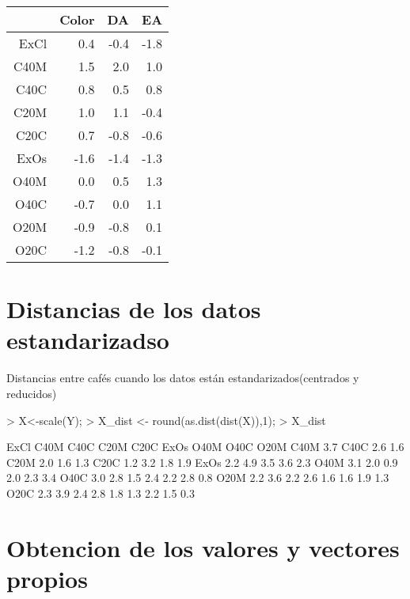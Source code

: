 \documentclass{article}
\begin{document}
\begin{table}[ht]
\centering
\begin{tabular}{rrrr}
\hline
& Color & DA & EA \\
\hline
ExCl & 0.4 & -0.4 & -1.8 \\
C40M & 1.5 & 2.0 & 1.0 \\
C40C & 0.8 & 0.5 & 0.8 \\
C20M & 1.0 & 1.1 & -0.4 \\
C20C & 0.7 & -0.8 & -0.6 \\
ExOs & -1.6 & -1.4 & -1.3 \\
O40M & 0.0 & 0.5 & 1.3 \\
O40C & -0.7 & 0.0 & 1.1 \\
O20M & -0.9 & -0.8 & 0.1 \\
O20C & -1.2 & -0.8 & -0.1 \\
\hline
\end{tabular}
\end{table}

\section{Distancias de los datos estandarizadso}
Distancias entre cafés cuando los datos están estandarizados(centrados y reducidos)

\begin{Schunk}
\begin{Sinput}
> X<-scale(Y); 
> X_dist <- round(as.dist(dist(X)),1);
> X_dist
\end{Sinput}
\begin{Soutput}
     ExCl C40M C40C C20M C20C ExOs O40M O40C O20M
C40M  3.7                                        
C40C  2.6  1.6                                   
C20M  2.0  1.6  1.3                              
C20C  1.2  3.2  1.8  1.9                         
ExOs  2.2  4.9  3.5  3.6  2.3                    
O40M  3.1  2.0  0.9  2.0  2.3  3.4               
O40C  3.0  2.8  1.5  2.4  2.2  2.8  0.8          
O20M  2.2  3.6  2.2  2.6  1.6  1.6  1.9  1.3     
O20C  2.3  3.9  2.4  2.8  1.8  1.3  2.2  1.5  0.3
\end{Soutput}
\end{Schunk}

\section{Obtencion de los valores y vectores propios}
\end{document}
